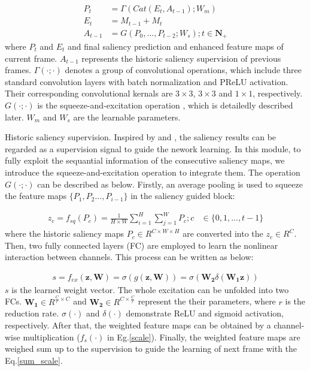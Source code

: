 \documentclass[12pt]{article}
\begin{document}
\begin{equation}
\label{enhance}
\begin{aligned}
   P_{t}  &= \Gamma(Cat(E_{t}, A_{t-1});W_m) \\
   E_{t}  &= M_{t-1} + M_{t} \\
   A_{t-1}  &= G(P_0, ..., P_{t-2};W_s); t \in \bm{N_{+}}
\end{aligned}
\end{equation} where $P_{t}$ and $E_{t}$ and final saliency prediction and enhanced feature maps of current frame. $A_{t-1}$ represents the historic saliency supervision of previous frames. $\Gamma(\cdot; \cdot)$ denotes a group of convolutional operations, which include three standard convolution layers with batch normalization and PReLU activation. Their corresponding convolutional kernals are $3 \times 3$, $3 \times 3$ and $1 \times 1$, respectively. $G(\cdot; \cdot)$ is the squeeze-and-excitation operation \cite{hu2018squeeze}, which is detailedly described later. $W_m$ and $W_s$ are the learnable parameters. 

Historic saliency supervision. Inspired by \cite{deng2018r3net} and \cite{wang2016saliency}, the saliency results can be regarded as a supervision signal to guide the nework learning. In this module, to fully exploit the sequantial information of the consecutive saliency maps, we introduce the squeeze-and-excitation operation to integrate them. The operation $G(\cdot; \cdot)$ can be described as below. Firstly, an average pooling is used to squeeze the feature maps $\{P_1, P_2 ..., P_{i-1}\}$ in the saliency guided block: 

\begin{equation}
\label{sq}
\begin{aligned}
   z_{c} =f_{sq}(P_c) = \frac{1}{H \times W} \sum\limits_{i=1}^{H} \sum\limits_{j=1}^{W} P_c; c &\in \{0,1,...,t-1\}
 \end{aligned}
\end{equation} where the historic saliency maps $P_c \in R^{C \times W \times H}$ are converted into the $z_c \in R^{C}$. Then, two fully connected layers (FC) are employed to learn the nonlinear interaction between channels. This process can be written as below:

\begin{equation}
\label{ex}
\begin{aligned}
   s = f_{ex}(\bm{z}, \textbf{W}) = \sigma(g(\bm{z}, \bm{W})) = \sigma(\bm{W_2}\delta(\bm{W_1}\bm{z}))
 \end{aligned}
\end{equation} $s$ is the learned weight vector. The whole excitation can be unfolded into two FCs. $\bm{W_1} \in R^{\frac{C}{r}\times C} $ and $\bm{W_2} \in R^{C\times \frac{C}{r}} $ represent the their parameters, where $r$ is the reduction rate. $\sigma(\cdot)$ and $\delta(\cdot)$ demonstrate ReLU and sigmoid activation, respectively. After that, the weighted feature maps can be obtained by a channel-wise multiplication ($f_{s}(\cdot)$ in Eg.\ref{scale}). Finally, the weighted feature maps are weighed sum up to the supervision to guide the learning of next frame with the Eq.\ref{sum_scale}.
\end{document}
